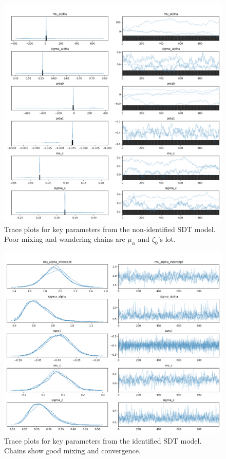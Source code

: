\documentclass[12pt]{article}
\begin{document}
\begin{figure}[tbhp]
    \centering
    \includegraphics[width=\linewidth]{nonid_sdt_trace.png}
    \caption{Trace plots for key parameters from the non-identified SDT model. Poor mixing and wandering chains are $\mu_\alpha$ and $\zeta_0$'s lot.}
    \label{fig:nonid_trace}
\end{figure}

\begin{figure}[tbhp]
    \centering
    \includegraphics[width=\linewidth]{id_sdt_trace.png}
    \caption{Trace plots for key parameters from the identified SDT model. Chains show good mixing and convergence.}
    \label{fig:id_trace}
\end{figure}
\end{document}
